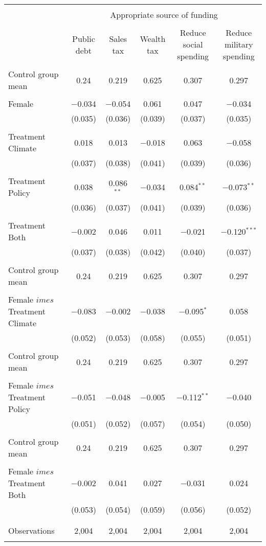 
\begin{tabular}{@{\extracolsep{5pt}}lccccc} 
\\[-1.8ex]\hline 
\hline \\[-1.8ex] 
 & \multicolumn{5}{c}{Appropriate source of funding} \\ 
\cline{2-6} 
\\[-1.8ex] & Public debt & Sales tax & Wealth tax & Reduce social spending & Reduce military spending \\ 
\hline \\[-1.8ex] 
 Control group mean & 0.24 & 0.219 & 0.625 & 0.307 & 0.297  \\ \hline \\[-1.8ex] Female & $-$0.034 & $-$0.054 & 0.061 & 0.047 & $-$0.034 \\ 
  & (0.035) & (0.036) & (0.039) & (0.037) & (0.035) \\ 
  & & & & & \\ 
 Treatment Climate & 0.018 & 0.013 & $-$0.018 & 0.063 & $-$0.058 \\ 
  & (0.037) & (0.038) & (0.041) & (0.039) & (0.036) \\ 
  & & & & & \\ 
 Treatment Policy & 0.038 & 0.086$^{**}$ & $-$0.034 & 0.084$^{**}$ & $-$0.073$^{**}$ \\ 
  & (0.036) & (0.037) & (0.041) & (0.039) & (0.036) \\ 
  & & & & & \\ 
 Treatment Both & $-$0.002 & 0.046 & 0.011 & $-$0.021 & $-$0.120$^{***}$ \\ 
  & (0.037) & (0.038) & (0.042) & (0.040) & (0.037) \\ 
  & & & & & \\ 
 Control group mean & 0.24 & 0.219 & 0.625 & 0.307 & 0.297  \\ \hline \\[-1.8ex] Female $	imes$ Treatment Climate & $-$0.083 & $-$0.002 & $-$0.038 & $-$0.095$^{*}$ & 0.058 \\ 
  & (0.052) & (0.053) & (0.058) & (0.055) & (0.051) \\ 
  & & & & & \\ 
 Control group mean & 0.24 & 0.219 & 0.625 & 0.307 & 0.297  \\ \hline \\[-1.8ex] Female $	imes$ Treatment Policy & $-$0.051 & $-$0.048 & $-$0.005 & $-$0.112$^{**}$ & $-$0.040 \\ 
  & (0.051) & (0.052) & (0.057) & (0.054) & (0.050) \\ 
  & & & & & \\ 
 Control group mean & 0.24 & 0.219 & 0.625 & 0.307 & 0.297  \\ \hline \\[-1.8ex] Female $	imes$ Treatment Both & $-$0.002 & 0.041 & 0.027 & $-$0.031 & 0.024 \\ 
  & (0.053) & (0.054) & (0.059) & (0.056) & (0.052) \\ 
  & & & & & \\ 
\hline \\[-1.8ex] 

Observations & 2,004 & 2,004 & 2,004 & 2,004 & 2,004 \\ 
\hline 
\hline \\[-1.8ex] 
\end{tabular} 